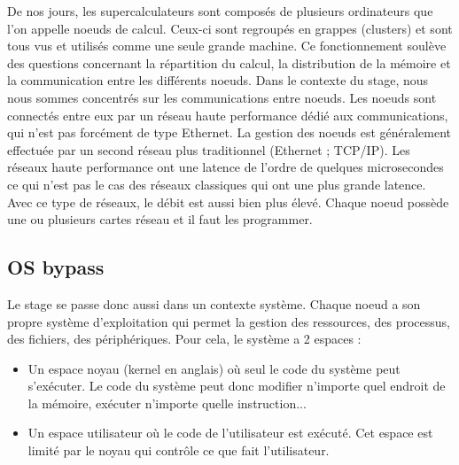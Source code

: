 De nos jours, les supercalculateurs sont composés de plusieurs ordinateurs que l'on appelle noeuds de calcul.
Ceux-ci sont regroupés en grappes (clusters) et sont tous vus et utilisés comme une seule grande machine.
Ce fonctionnement soulève des questions concernant la répartition du calcul, la distribution de la mémoire et la communication entre les différents noeuds.
Dans le contexte du stage, nous nous sommes concentrés sur les communications entre noeuds.
Les noeuds sont connectés entre eux par un réseau haute performance dédié aux communications, qui n'est pas forcément de type Ethernet.
La gestion des noeuds est généralement effectuée par un second réseau plus traditionnel (Ethernet ; TCP/IP).
Les réseaux haute performance ont une latence de l'ordre de quelques microsecondes ce qui n'est pas le cas des réseaux classiques qui ont une plus grande latence.
Avec ce type de réseaux, le débit est aussi bien plus élevé.
Chaque noeud possède une ou plusieurs cartes réseau et il faut les programmer.

\subsection{OS bypass}

Le stage se passe donc aussi dans un contexte système.
Chaque noeud a son propre système d'exploitation qui permet la gestion des ressources, des processus, des fichiers, des périphériques.
Pour cela, le système a 2 espaces :
\begin{itemize}
  \item Un espace noyau (kernel en anglais) où seul le code du système peut s'exécuter.
  Le code du système peut donc modifier n'importe quel endroit de la mémoire, exécuter n'importe quelle instruction...
  \item Un espace utilisateur où le code de l'utilisateur est exécuté.
  Cet espace est limité par le noyau qui contrôle ce que fait l'utilisateur.
\end{itemize}

